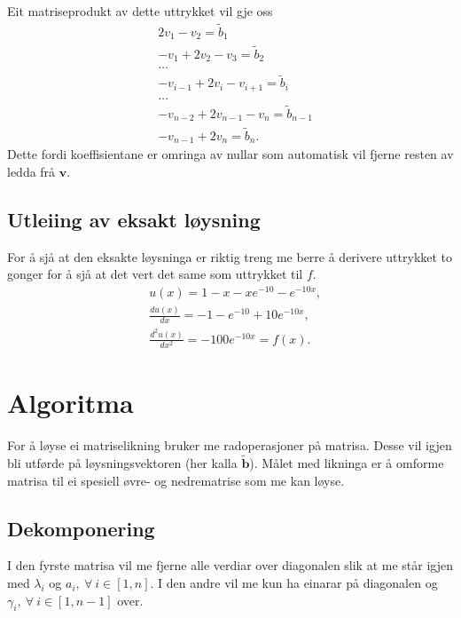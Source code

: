 \documentclass[11pt, a4paper]{article}
\begin{document}
  Eit matriseprodukt av dette uttrykket vil gje oss
  \begin{align*}
    &2v_1 - v_2 = \tilde{b}_1 \\
    &-v_1 + 2v_2 - v_3 = \tilde{b}_2 \\
    &\dots \\
    &-v_{i-1} + 2v_i - v_{i+1} = \tilde{b}_i \\
    &\dots \\
    &-v_{n-2} + 2v_{n-1} -v_{n} = \tilde{b}_{n-1} \\
    &-v_{n-1} + 2v_{n} = \tilde{b}_n.
  \end{align*}
  Dette fordi koeffisientane er omringa av nullar som automatisk vil fjerne resten av ledda frå 
  $\mathbf{v}$.

  \subsection{Utleiing av eksakt løysning}
    For å sjå at den eksakte løysninga er riktig treng me berre å derivere uttrykket to gonger for å
    sjå at det vert det same som uttrykket til $f$.
    \begin{align*}
      &u(x) = 1 - x - xe^{-10} - e^{-10x}, \\
      &\frac{du(x)}{dx} = -1 -e^{-10} + 10e^{-10x}, \\
      &\frac{d^2u(x)}{dx^2} = -100e^{-10x} = f(x).
    \end{align*}

\newpage

\section{Algoritma}
  For å løyse ei matriselikning bruker me radoperasjoner på matrisa. Desse vil igjen bli utførde på
  løysningsvektoren (her kalla $\mathbf{\tilde{b}}$). Målet med likninga er å omforme matrisa til ei 
  spesiell øvre-  og nedrematrise som me kan løyse. 
  
  \subsection{Dekomponering}
    I den fyrste matrisa vil me fjerne alle verdiar over diagonalen slik at me står igjen med 
    $\lambda_i$ og $a_i, \ \forall \ i \in [1, n]$. I den andre vil me kun ha einarar på 
    diagonalen og $\gamma_i, \ \forall \ i \in [1, n - 1]$ over.
\end{document}
